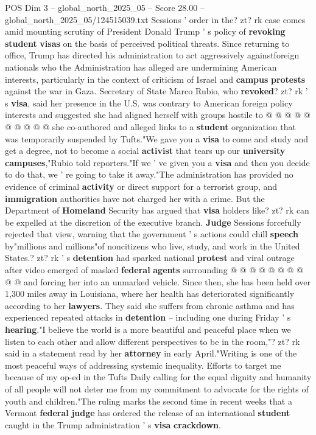 \begin{textsample}{POS Dim 3 – global\_north\_2025\_05 – Score 28.00 – global\_north\_2025\_05/124515039.txt}
Sessions ' order in the? zt? rk case comes amid mounting scrutiny of President Donald Trump ' s policy of \textbf{revoking} \textbf{student} \textbf{visas} on the basis of perceived political threats.
Since returning to office, Trump has directed his administration to act aggressively againstforeign nationals who the Administration has alleged are undermining American interests, particularly in the context of criticism of Israel and \textbf{campus} \textbf{protests} against the war in Gaza.
Secretary of State Marco Rubio, who \textbf{revoked}? zt? rk ' s \textbf{visa}, said her presence in the U.S. was contrary to American foreign policy interests and suggested she had aligned herself with groups hostile to @ @ @ @ @ @ @ @ @ @ she co-authored and alleged links to a \textbf{student} organization that was temporarily suspended by Tufts."We gave you a \textbf{visa} to come and study and get a degree, not to become a social \textbf{activist} that tears up our \textbf{university} \textbf{campuses},"Rubio told reporters."If we ' ve given you a \textbf{visa} and then you decide to do that, we ' re going to take it away."The administration has provided no evidence of criminal \textbf{activity} or direct support for a terrorist group, and \textbf{immigration} authorities have not charged her with a crime.
But the Department of \textbf{Homeland} Security has argued that \textbf{visa} holders like? zt? rk can be expelled at the discretion of the executive branch. \textbf{Judge} Sessions forcefully rejected that view, warning that the government ' s actions could chill \textbf{speech} by"millions and millions"of noncitizens who live, study, and work in the United States.? zt? rk ' s \textbf{detention} had sparked national \textbf{protest} and viral outrage after video emerged of masked \textbf{federal} \textbf{agents} surrounding @ @ @ @ @ @ @ @ @ @ and forcing her into an unmarked vehicle.
Since then, she has been held over 1,300 miles away in Louisiana, where her health has deteriorated significantly according to her \textbf{lawyers}.
They said she suffers from chronic asthma and has experienced repeated attacks in \textbf{detention} -- including one during Friday ' s \textbf{hearing}."I believe the world is a more beautiful and peaceful place when we listen to each other and allow different perspectives to be in the room,"? zt? rk said in a statement read by her \textbf{attorney} in early April."Writing is one of the most peaceful ways of addressing systemic inequality.
Efforts to target me because of my op-ed in the Tufts Daily calling for the equal dignity and humanity of all people will not deter me from my commitment to advocate for the rights of youth and children."The ruling marks the second time in recent weeks that a Vermont \textbf{federal} \textbf{judge} has ordered the release of an international \textbf{student} caught in the Trump administration ' s \textbf{visa} \textbf{crackdown}.

\end{textsample}
